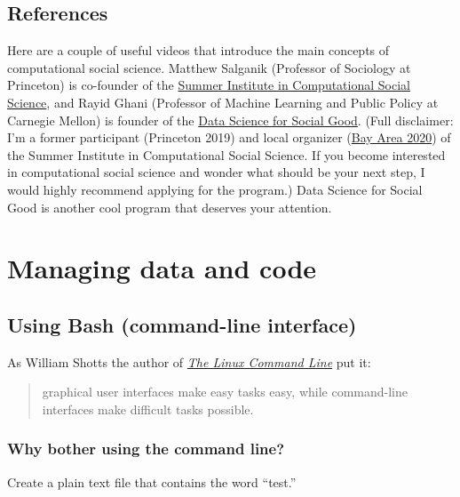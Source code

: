 \documentclass[
]{book}
\begin{document}
\hypertarget{references}{%
\section{References}\label{references}}

Here are a couple of useful videos that introduce the main concepts of computational social science. Matthew Salganik (Professor of Sociology at Princeton) is co-founder of the \href{https://sicss.io/}{Summer Institute in Computational Social Science}, and Rayid Ghani (Professor of Machine Learning and Public Policy at Carnegie Mellon) is founder of the \href{https://www.dssgfellowship.org/}{Data Science for Social Good}. (Full disclaimer: I'm a former participant (Princeton 2019) and local organizer (\href{https://sicss.io/2020/bay_area/}{Bay Area 2020}) of the Summer Institute in Computational Social Science. If you become interested in computational social science and wonder what should be your next step, I would highly recommend applying for the program.) Data Science for Social Good is another cool program that deserves your attention.

\hypertarget{git_bash}{%
\chapter{Managing data and code}\label{git_bash}}

\hypertarget{using-bash-command-line-interface}{%
\section{Using Bash (command-line interface)}\label{using-bash-command-line-interface}}

As William Shotts the author of \emph{\href{http://linuxcommand.org/tlcl.php}{The Linux Command Line}} put it:

\begin{quote}
graphical user interfaces make easy tasks easy, while command-line interfaces make difficult tasks possible.
\end{quote}

\hypertarget{why-bother-using-the-command-line}{%
\subsection{Why bother using the command line?}\label{why-bother-using-the-command-line}}

Create a plain text file that contains the word ``test.''
\end{document}
